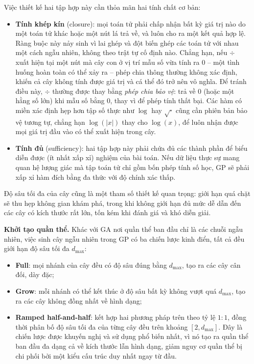 Việc thiết kế hai tập hợp này cần thỏa mãn hai tính chất cơ bản:
\begin{itemize}
    \item \textbf{Tính khép kín} (closure): mọi toán tử phải chấp
    nhận bất kỳ giá trị nào do một toán tử khác hoặc một nút lá trả
    về, và luôn cho ra một kết quả hợp lệ. Ràng buộc này nảy sinh vì
    lai ghép và đột biến ghép các toán tử với nhau một cách ngẫu
    nhiên, không theo trật tự cố định nào. Chẳng hạn, nếu $\div$ xuất
    hiện tại một nút mà cây con ở vị trí mẫu số vừa tính ra $0$ --
    một tình huống hoàn toàn có thể xảy ra -- phép chia thông thường
    không xác định, khiến cả cây không tính được giá trị và cá thể
    đó trở nên vô nghĩa. Để tránh điều này, $\div$ thường được thay
    bằng \textit{phép chia bảo vệ}: trả về $0$ (hoặc một hằng số
    lớn) khi mẫu số bằng $0$, thay vì để phép tính thất bại. Các hàm
    có miền xác định hẹp hơn tập số thực như $\log$ hay $\sqrt{\cdot}$
    cũng cần phiên bản bảo vệ tương tự, chẳng hạn $\log(|x|)$ thay
    cho $\log(x)$, để luôn nhận được mọi giá trị đầu vào có thể xuất
    hiện trong cây.
    \item \textbf{Tính đủ} (sufficiency): hai tập hợp này phải chứa
    đủ các thành phần để biểu diễn được (ít nhất xấp xỉ) nghiệm của
    bài toán. Nếu dữ liệu thực sự mang quan hệ lượng giác mà tập toán
    tử chỉ gồm bốn phép tính số học, GP sẽ phải xấp xỉ hàm đích bằng
    đa thức với độ chính xác thấp.
\end{itemize}

Độ sâu tối đa của cây cũng là một tham số thiết kế quan trọng: giới hạn
quá chặt sẽ thu hẹp không gian khám phá, trong khi không giới hạn đủ
mức dễ dẫn đến các cây có kích thước rất lớn, tốn kém khi đánh giá và
khó diễn giải.

\textbf{Khởi tạo quần thể.} Khác với GA nơi quần thể ban đầu chỉ là các
chuỗi ngẫu nhiên, việc sinh cây ngẫu nhiên trong GP có ba chiến lược
kinh điển, tất cả đều giới hạn độ sâu tối đa $d_{\max}$:
\begin{itemize}
    \item \textbf{Full}: mọi nhánh của cây đều có
    độ sâu đúng bằng $d_{\max}$, tạo ra các cây cân đối, dày đặc;
    \item \textbf{Grow}: mỗi nhánh có thể kết thúc ở
    độ sâu bất kỳ không vượt quá $d_{\max}$, tạo ra các cây không đồng
    nhất về hình dạng;
    \item \textbf{Ramped half-and-half}:
    kết hợp hai phương pháp trên theo tỷ lệ $1:1$, đồng thời phân bố
    độ sâu tối đa của từng cây đều trên khoảng
    $[2, d_{\max}]$. Đây là chiến lược được khuyến nghị và sử dụng
    phổ biến nhất, vì nó tạo ra quần thể ban đầu đa dạng cả về kích
    thước lẫn hình dạng, giảm nguy cơ quần thể bị chi phối bởi một
    kiểu cấu trúc duy nhất ngay từ đầu.
\end{itemize}

